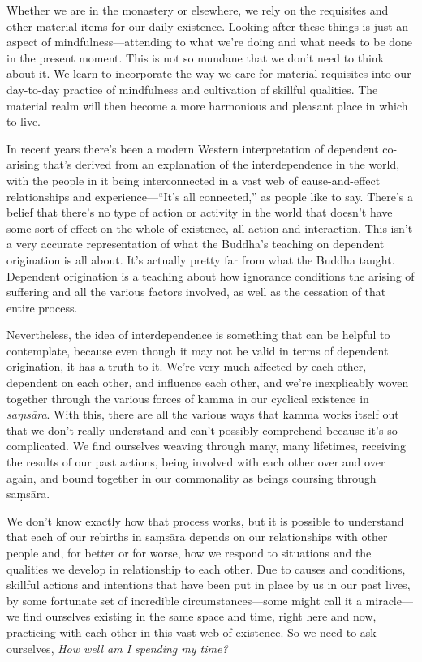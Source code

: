 Whether we are in the monastery or elsewhere, we rely on the requisites 
and other material items for our daily existence. Looking after these 
things is just an aspect of mindfulness---attending to what we're doing 
and what needs to be done in the present moment. This is not so mundane 
that we don't need to think about it. We learn to incorporate the way 
we care for material requisites into our day-to-day practice of 
mindfulness and cultivation of skillful qualities. The material realm 
will then become a more harmonious and pleasant place in which to live.


In recent years there's been a modern Western interpretation of 
dependent co-arising that's derived from an explanation of the 
interdependence in the world, with the people in it being 
interconnected in a vast web of cause-and-effect relationships and 
experience---``It's all connected,'' as people like to say. There's a 
belief that there's no type of action or activity in the world that 
doesn't have some sort of effect on the whole of existence, all action 
and interaction. This isn't a very accurate representation of what the 
Buddha's teaching on dependent origination is all about. It's actually 
pretty far from what the Buddha taught. Dependent origination is a 
teaching about how ignorance conditions the arising of suffering and 
all the various factors involved, as well as the cessation of that 
entire process.

Nevertheless, the idea of interdependence is something that can be 
helpful to contemplate, because even though it may not be valid in 
terms of dependent origination, it has a truth to it. We're very much 
affected by each other, dependent on each other, and influence each 
other, and we're inexplicably woven together through the various forces 
of kamma in our cyclical existence in \emph{saṃsāra}. With this, 
there are all the various ways that kamma works itself out that we 
don't really understand and can't possibly comprehend because it's so 
complicated. We find ourselves weaving through many, many lifetimes, 
receiving the results of our past actions, being involved with each 
other over and over again, and bound together in our commonality as 
beings coursing through saṃsāra.

We don't know exactly how that process works, but it is possible to 
understand that each of our rebirths in saṃsāra depends on our 
relationships with other people and, for better or for worse, how we 
respond to situations and the qualities we develop in relationship to 
each other. Due to causes and conditions, skillful actions and 
intentions that have been put in place by us in our past lives, by some 
fortunate set of incredible circumstances---some might call it a 
miracle---we find ourselves existing in the same space and time, right 
here and now, practicing with each other in this vast web of existence. 
So we need to ask ourselves, \emph{How well am I spending my time?}

